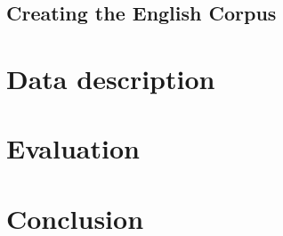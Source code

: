 \documentclass{llncs}
\begin{document}
\subsection{Creating the English Corpus}

\section{Data description}

\section{Evaluation}

\section{Conclusion}

\cite{Nothman:08} \cite{Szarvas:06} \cite{Medelyan:09}

%
%


\end{document}
